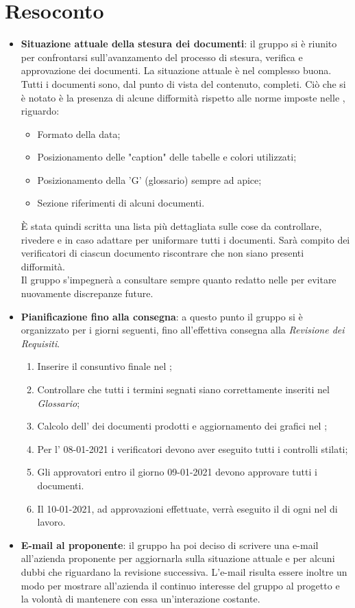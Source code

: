 \section{Resoconto}
\begin{itemize}
\item \textbf{Situazione attuale della stesura dei documenti}: il gruppo si è riunito per confrontarsi sull'avanzamento del processo di stesura, verifica e approvazione dei documenti. La situazione attuale è nel complesso buona. Tutti i documenti sono, dal punto di vista del contenuto, completi. Ciò che si è notato è la presenza di alcune difformità rispetto alle norme imposte nelle \NdPv{}, riguardo:
	\begin{itemize}
		\item Formato della data;
		\item Posizionamento delle "caption" delle tabelle e colori utilizzati;
		\item Posizionamento della 'G' (glossario) sempre ad apice;
		\item Sezione riferimenti di alcuni documenti.
	\end{itemize} 
È stata quindi scritta una lista più dettagliata sulle cose da controllare, rivedere e in caso adattare per uniformare tutti i documenti. Sarà compito dei verificatori di ciascun documento riscontrare che non siano presenti difformità. \\
Il gruppo s'impegnerà a consultare sempre quanto redatto nelle \NdPv{} per evitare nuovamente discrepanze future.

\item \textbf{Pianificazione fino alla consegna}: a questo punto il gruppo si è organizzato per i giorni seguenti, fino all'effettiva consegna alla \textit{Revisione dei Requisiti}. 
	\begin{enumerate}
		\item Inserire il consuntivo finale nel \PdPv{};
		\item Controllare che tutti i termini segnati siano correttamente inseriti nel \textit{Glossario};
		\item Calcolo dell' dei documenti prodotti e aggiornamento dei grafici nel \PdQv{};
		\item Per l' 08-01-2021 i verificatori devono aver eseguito tutti i controlli stilati;
		\item Gli approvatori entro il giorno 09-01-2021 devono approvare tutti i documenti.
		\item Il 10-01-2021, ad approvazioni effettuate, verrà eseguito il  di ogni  nel  di lavoro.
	\end{enumerate}
	
\item \textbf{E-mail al proponente}: il gruppo ha poi deciso di scrivere una e-mail all'azienda proponente per aggiornarla sulla situazione attuale e per alcuni dubbi che riguardano la revisione successiva. L'e-mail risulta essere inoltre un modo per mostrare all'azienda il continuo interesse del gruppo al progetto e la volontà di mantenere con essa un'interazione costante.
\end{itemize}
\newpage